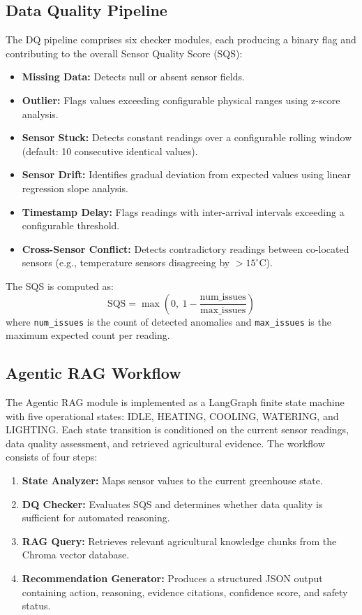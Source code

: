 \documentclass[runningheads]{llncs}
\begin{document}
\subsection{Data Quality Pipeline}
The DQ pipeline comprises six checker modules, each producing a binary flag and contributing to the overall Sensor Quality Score (SQS):
\begin{itemize}
    \item \textbf{Missing Data:} Detects null or absent sensor fields.
    \item \textbf{Outlier:} Flags values exceeding configurable physical ranges using z-score analysis.
    \item \textbf{Sensor Stuck:} Detects constant readings over a configurable rolling window (default: 10 consecutive identical values).
    \item \textbf{Sensor Drift:} Identifies gradual deviation from expected values using linear regression slope analysis.
    \item \textbf{Timestamp Delay:} Flags readings with inter-arrival intervals exceeding a configurable threshold.
    \item \textbf{Cross-Sensor Conflict:} Detects contradictory readings between co-located sensors (e.g., temperature sensors disagreeing by $>15^{\circ}$C).
\end{itemize}

The SQS is computed as:
\begin{equation}
\text{SQS} = \max\left(0,\ 1 - \frac{\text{num\_issues}}{\text{max\_issues}}\right)
\label{eq:sqs}
\end{equation}
where \texttt{num\_issues} is the count of detected anomalies and \texttt{max\_issues} is the maximum expected count per reading.

\subsection{Agentic RAG Workflow}
The Agentic RAG module is implemented as a LangGraph finite state machine with five operational states: IDLE, HEATING, COOLING, WATERING, and LIGHTING. Each state transition is conditioned on the current sensor readings, data quality assessment, and retrieved agricultural evidence. The workflow consists of four steps:
\begin{enumerate}
    \item \textbf{State Analyzer:} Maps sensor values to the current greenhouse state.
    \item \textbf{DQ Checker:} Evaluates SQS and determines whether data quality is sufficient for automated reasoning.
    \item \textbf{RAG Query:} Retrieves relevant agricultural knowledge chunks from the Chroma vector database.
    \item \textbf{Recommendation Generator:} Produces a structured JSON output containing action, reasoning, evidence citations, confidence score, and safety status.
\end{enumerate}
\end{document}
